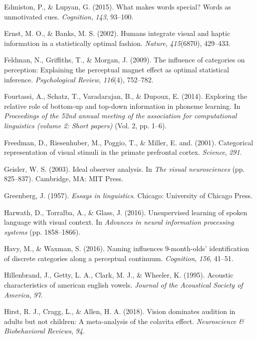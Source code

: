 \documentclass[english,,man,floatsintext]{apa6}
\theoremstyle{definition}
\theoremstyle{definition}
\theoremstyle{definition}
\theoremstyle{remark}
\begin{document}
\hypertarget{ref-edmiston2015}{}
Edmiston, P., \& Lupyan, G. (2015). What makes words special? Words as
unmotivated cues. \emph{Cognition}, \emph{143}, 93--100.

\hypertarget{ref-ernst02}{}
Ernst, M. O., \& Banks, M. S. (2002). Humans integrate visual and haptic
information in a statistically optimal fashion. \emph{Nature},
\emph{415}(6870), 429--433.

\hypertarget{ref-feldman2009}{}
Feldman, N., Griffiths, T., \& Morgan, J. (2009). The influence of
categories on perception: Explaining the perceptual magnet effect as
optimal statistical inference. \emph{Psychological Review},
\emph{116}(4), 752--782.

\hypertarget{ref-fourtassi2014b}{}
Fourtassi, A., Schatz, T., Varadarajan, B., \& Dupoux, E. (2014).
Exploring the relative role of bottom-up and top-down information in
phoneme learning. In \emph{Proceedings of the 52nd annual meeting of the
association for computational linguistics (volume 2: Short papers)}
(Vol. 2, pp. 1--6).

\hypertarget{ref-freedman2001}{}
Freedman, D., Riesenhuber, M., Poggio, T., \& Miller, E. and. (2001).
Categorical representation of visual stimuli in the primate prefrontal
cortex. \emph{Science}, \emph{291}.

\hypertarget{ref-Geisler2003}{}
Geisler, W. S. (2003). Ideal observer analysis. In \emph{The visual
neurosciences} (pp. 825--837). Cambridge, MA: MIT Press.

\hypertarget{ref-greenberg1957}{}
Greenberg, J. (1957). \emph{Essays in linguistics}. Chicago: University
of Chicago Press.

\hypertarget{ref-harwath2016}{}
Harwath, D., Torralba, A., \& Glass, J. (2016). Unsupervised learning of
spoken language with visual context. In \emph{Advances in neural
information processing systems} (pp. 1858--1866).

\hypertarget{ref-havy2016}{}
Havy, M., \& Waxman, S. (2016). Naming influences 9-month-olds'
identification of discrete categories along a perceptual continuum.
\emph{Cognition}, \emph{156}, 41--51.

\hypertarget{ref-hillenbrand1995}{}
Hillenbrand, J., Getty, L. A., Clark, M. J., \& Wheeler, K. (1995).
Acoustic characteristics of american english vowels. \emph{Journal of
the Acoustical Society of America}, \emph{97}.

\hypertarget{ref-hirst2018}{}
Hirst, R. J., Cragg, L., \& Allen, H. A. (2018). Vision dominates
audition in adults but not children: A meta-analysis of the colavita
effect. \emph{Neuroscience \& Biobehavioral Reviews}, \emph{94}.
\end{document}
